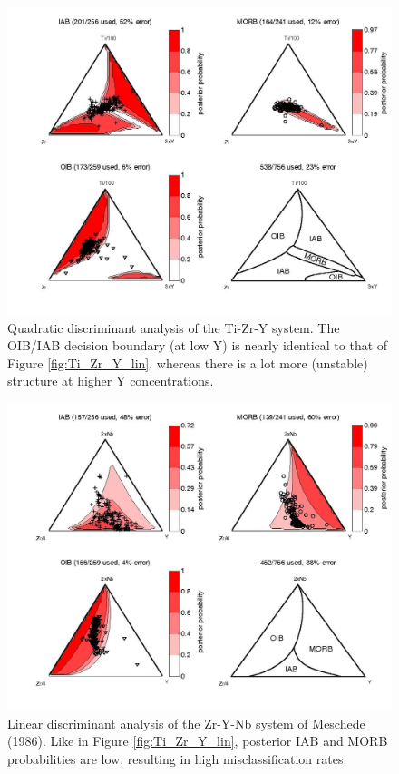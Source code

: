 \begin{figure}[htbp]
  \centering
  \includegraphics[width=600]{figures/Ti_Zr_Y_quad.jpg}
  \caption[Quadratic discriminant analysis of the Ti-Zr-Y system]
{Quadratic discriminant  analysis of the Ti-Zr-Y  system.  The OIB/IAB
decision boundary  (at low  Y) is nearly  identical to that  of Figure
\ref{fig:Ti_Zr_Y_lin},  whereas   there  is  a   lot  more  (unstable)
structure at higher Y concentrations.}
  \label{fig:Ti_Zr_Y_quad}
\end{figure}

\begin{figure}[htbp]
  \centering
  \includegraphics[width=600]{figures/Nb_Zr_Y_lin.jpg}
  \caption[Linear discriminant analysis of the Zr-Y-Nb system of Meschede (1986)]
{Linear  discriminant  analysis  of  the Zr-Y-Nb  system  of  Meschede
(1986). Like  in Figure \ref{fig:Ti_Zr_Y_lin}, posterior  IAB and MORB
probabilities are low, resulting in high misclassification rates.}
  \label{fig:Nb_Zr_Y_lin}
\end{figure}

